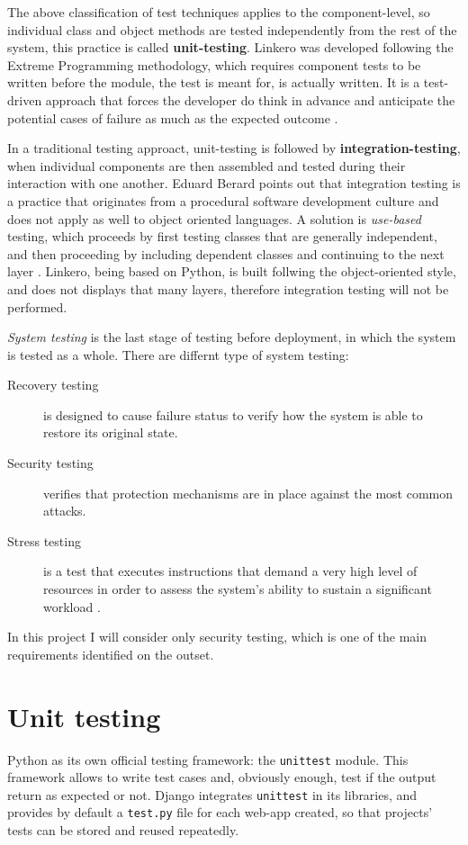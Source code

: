 The above classification of test techniques applies to the component-level, so
individual class and object methods are tested independently from the rest of
the system, this practice is called \textbf{unit-testing}. Linkero was developed
following the Extreme Programming methodology, which requires component tests to
be written before the module, the test is meant for, is actually written. It is
a test-driven approach that forces the developer do think in advance and
anticipate the potential cases of failure as much as the expected outcome
\cite{VV08}.

In a traditional testing approact, unit-testing is followed by
\textbf{integration-testing}, when individual components are then assembled and
tested during their interaction with one another. Eduard Berard points out that
integration testing is a practice that originates from a procedural software
development culture and does not apply as well to object oriented languages. A
solution is \emph{use-based} testing, which proceeds by first testing classes
that are generally independent, and then proceeding by including dependent
classes and continuing to the next layer \cite{EB93}. Linkero, being based on
Python, is built follwing the object-oriented style, and does not displays that
many layers, therefore integration testing will not be performed.

\emph{System testing} is the last stage of testing before deployment, in which
the system is tested as a whole. There are differnt type of system testing:
\begin{description}
\item[Recovery testing] is designed to cause failure status to verify how the
system is able to restore its original state.
\item[Security testing] verifies that protection mechanisms are in place against
the most common attacks.
\item[Stress testing] is a test that executes instructions that demand a very
high level of resources in order to assess the system's ability to sustain a
significant workload \cite{RP05}.
\end{description}

In this project I will consider only security testing, which is one of the main
requirements identified on the outset.


\section{Unit testing}
Python as its own official testing framework: the \texttt{unittest} module. This
framework allows to write test cases and, obviously enough, test if the output
return as expected or not. Django integrates \texttt{unittest} in its libraries,
and provides by default a \texttt{test.py} file for each web-app created, so
that projects' tests can be stored and reused repeatedly.

